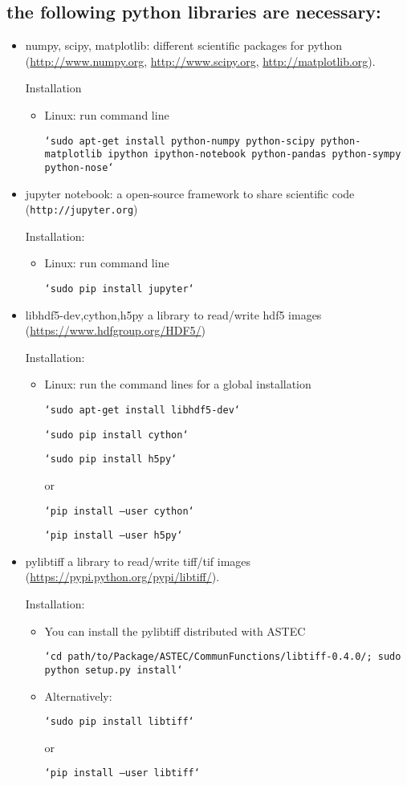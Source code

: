 \subsection{the following python libraries are necessary:}
\begin{itemize}
\item numpy, scipy, matplotlib: different scientific packages for python  
(\url{http://www.numpy.org}, \url{http://www.scipy.org}, \url{http://matplotlib.org}).

Installation
\begin{itemize}
\item Linux: run command line 

\texttt{`sudo apt-get install python-numpy python-scipy python-matplotlib ipython ipython-notebook python-pandas python-sympy python-nose`}
\end{itemize}

\item jupyter notebook: a open-source framework to share scientific code (\texttt{http://jupyter.org})

Installation:
\begin{itemize}
\item Linux: run command line 

\texttt{`sudo pip install jupyter`}
\end{itemize}

 \item libhdf5-dev,cython,h5py  a library to read/write hdf5 images (\url{https://www.hdfgroup.org/HDF5/})
 
 Installation:
 \begin{itemize}
 \item Linux: run the command lines for a global installation
 
 \texttt{`sudo apt-get install libhdf5-dev`}
 
 \texttt{`sudo pip install cython`}
 
 \texttt{`sudo pip install h5py`}
 
 or 
 
  \texttt{`pip install --user cython`}
 
 \texttt{`pip install --user h5py`}
 
 \end{itemize}

 \item pylibtiff  a library to read/write tiff/tif images (\url{https://pypi.python.org/pypi/libtiff/}).
 
 Installation:
\begin{itemize} 
\item  You can install the pylibtiff distributed with ASTEC
 
\texttt{`cd path/to/Package/ASTEC/CommunFunctions/libtiff-0.4.0/; sudo python setup.py install`}

\item Alternatively:

\texttt{`sudo pip install libtiff`}

or 

\texttt{`pip install --user libtiff`}
\end{itemize}
\end{itemize}


